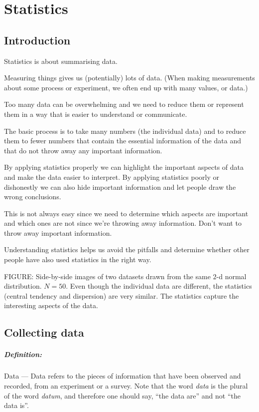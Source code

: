 \documentclass[a4paper,11pt]{report}
\def\Definition#1#2{\paragraph{Definition:} #1 --- #2}
\begin{document}
\chapter{Statistics}

\section{Introduction}

Statistics is about summarising data.

Measuring things gives us (potentially) lots of data.
(When making measurements about some process or experiment, we often
end up with many values, or data.)

Too many data can be overwhelming and we need to reduce them or
represent them in a way that is easier to understand or communicate.

The basic process is to take many numbers (the individual data) and to
reduce them to fewer numbers that contain the essential information of
the data and that do not throw away any important information.

By applying statistics properly we can highlight the important aspects
of data and make the data easier to interpret. By applying statistics
poorly or dishonestly we can also hide important information and let
people draw the wrong conclusions.

This is not always easy since we need to determine which aspects are
important and which ones are not since we're throwing away
information. Don't want to throw away important information.

Understanding statistics helps us avoid the pitfalls and determine
whether other people have also used statistics in the right way.

FIGURE: Side-by-side images of two datasets drawn from the same $2$-d
normal distribution. $N = 50$. Even though the individual data are
different, the statistics (central tendency and dispersion) are very
similar. The statistics capture the interesting aspects of the data.

\section{Collecting data}
\Definition{Data}{Data refers to the pieces of information that have
  been observed and recorded, from an experiment or a survey. Note
  that the word {\em data} is the plural of the word {\em datum}, and
  therefore one should say, ``the data are'' and not ``the data is''.}
\end{document}
